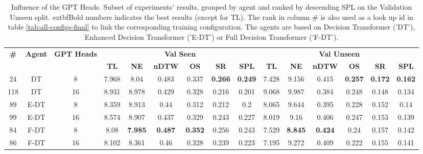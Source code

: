 \begin{table}
\centering
\caption{\label{tab:heads}Influence of the GPT Heads. Subset of experiments' results, grouped by agent and ranked by descending SPL on the Validation Unseen split. 	extbf{Bold} numbers indicates the best results (except for TL). The rank in column \# is also used as a look up id in table \ref{tab:all-configs-final} to link the corresponding training configuration.     \newline The agents are based on Decision Transformer ('DT'), Enhanced Decision Transformer ('E-DT') or Full Decision Transformer ('F-DT').}
\begin{tabular}{@{\hskip3pt}c@{\hskip3pt}c@{\hskip3pt}c@{\hskip3pt}c@{\hskip3pt}c@{\hskip3pt}c@{\hskip3pt}c@{\hskip3pt}c@{\hskip3pt}c@{\hskip3pt}c@{\hskip3pt}c@{\hskip3pt}c@{\hskip3pt}c@{\hskip3pt}c@{\hskip3pt}c}
\toprule
\textbf{\#} & \textbf{Agent} & \textbf{GPT Heads} & \multicolumn{6}{c}{\textbf{Val Seen}} & \multicolumn{6}{c}{\textbf{Val Unseen}} \\
 \textbf{~} &     \textbf{~} &         \textbf{~} &       \textbf{TL} &     \textbf{NE} &   \textbf{nDTW} &     \textbf{OS} &     \textbf{SR} &    \textbf{SPL} &         \textbf{TL} &     \textbf{NE} &   \textbf{nDTW} &     \textbf{OS} &     \textbf{SR} &    \textbf{SPL} \\
\midrule
         24 &             DT &                  8 &             7.968 &            8.04 &           0.483 &           0.337 &  \textbf{0.266} &  \textbf{0.249} &               7.428 &           9.156 &           0.415 &  \textbf{0.257} &  \textbf{0.172} &  \textbf{0.162} \\
        118 &             DT &                 16 &             8.931 &           8.978 &           0.429 &           0.328 &           0.216 &           0.201 &               9.068 &           9.987 &           0.384 &           0.248 &           0.148 &           0.134 \\
         89 &           E-DT &                  8 &             8.359 &           8.913 &            0.44 &           0.312 &           0.212 &             0.2 &               8.065 &           9.644 &           0.395 &           0.228 &           0.152 &            0.14 \\
         99 &           E-DT &                 16 &             8.574 &           8.907 &           0.437 &           0.329 &           0.243 &           0.227 &               8.019 &            9.16 &           0.406 &           0.247 &           0.153 &           0.139 \\
         84 &           F-DT &                  8 &              8.08 &  \textbf{7.985} &  \textbf{0.487} &  \textbf{0.352} &           0.256 &           0.243 &               7.529 &  \textbf{8.845} &  \textbf{0.424} &            0.24 &           0.157 &           0.142 \\
         86 &           F-DT &                 16 &             8.102 &           8.361 &            0.46 &           0.328 &           0.239 &           0.223 &               7.195 &           9.272 &           0.409 &           0.222 &           0.155 &           0.141 \\
\bottomrule
\end{tabular}
\end{table}
